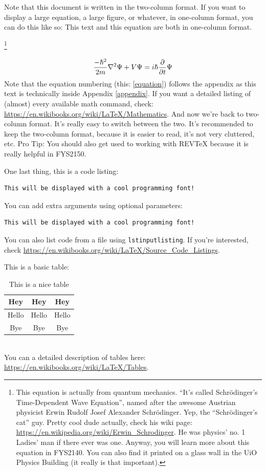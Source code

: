 \documentclass[reprint,english,notitlepage]{revtex4-2}  %
\begin{document}
\clearpage
Note that this document is written in the two-column format. If you want to display a large equation, a large figure, or whatever, in one-column format, you can do this like so:
\onecolumngrid
\vspace{1cm} %
This text and this equation are both in one-column format.

\footnote{This equation is actually from quantum mechanics. ``It's called Schrödinger's Time-Dependent Wave Equation'', named after the awesome Austrian physicist Erwin Rudolf Josef Alexander Schrödinger. Yep, the ``Schrödinger's cat'' guy. Pretty cool dude actually, check his wiki page: \url{https://en.wikipedia.org/wiki/Erwin_Schrodinger}. He was physics' no. 1 Ladies' man if there ever was one. Anyway, you will learn more about this equation in FYS2140. You can also find it printed on a glass wall in the UiO Physics Building (it really is that important).}

\begin{equation}\label{equation}
\frac{-\hbar^2}{2m}\laplacian{\Psi}+V\Psi=i\hbar\pdv{t}\Psi
\end{equation}
Note that the equation numbering (this: \ref{equation}) follows the appendix as this text is technically inside Appendix \ref{appendix}. If you want a detailed listing of (almost) every available math command, check: \url{https://en.wikibooks.org/wiki/LaTeX/Mathematics}.
\vspace{1cm} %
\twocolumngrid
And now we're back to two-column format. It's really easy to switch between the two. It's recommended to keep the two-column format, because it is easier to read, it's not very cluttered, etc. Pro Tip: You should also get used to working with REVTeX because it is really helpful in FYS2150.

One last thing, this is a code listing:
\begin{lstlisting}
This will be displayed with a cool programming font!
\end{lstlisting}
You can add extra arguments using optional parameters:
\begin{lstlisting}[morekeywords={cool}]
This will be displayed with a cool programming font!
\end{lstlisting}
You can also list code from a file using \texttt{lstinputlisting}. If you're interested, check \url{https://en.wikibooks.org/wiki/LaTeX/Source_Code_Listings}.

This is a basic table:
\begin{table}[h]  %
\caption{This is a nice table}\label{table}
\begin{tabular}{|c|c|c|} %
\hline                    %
Hey & Hey & Hey  \\
\hline
Hello & Hello & Hello \\
\hline
Bye & Bye & Bye \\
\hline
\end{tabular}
\end{table}\\
You can a detailed description of tables here: \url{https://en.wikibooks.org/wiki/LaTeX/Tables}.
\end{document}
